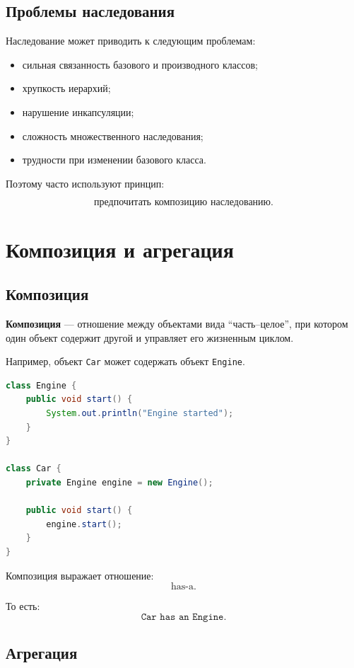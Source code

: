 \documentclass[12pt,a4paper]{article}
\begin{document}
\subsection{Проблемы наследования}

Наследование может приводить к следующим проблемам:
\begin{itemize}
    \item сильная связанность базового и производного классов;
    \item хрупкость иерархий;
    \item нарушение инкапсуляции;
    \item сложность множественного наследования;
    \item трудности при изменении базового класса.
\end{itemize}

Поэтому часто используют принцип:

\[
\text{предпочитать композицию наследованию.}
\]

\section{Композиция и агрегация}

\subsection{Композиция}

\textbf{Композиция} --- отношение между объектами вида ``часть--целое'', при котором один объект содержит другой и управляет его жизненным циклом.

Например, объект \texttt{Car} может содержать объект \texttt{Engine}.

\begin{lstlisting}[language=Java,caption={Композиция}]
class Engine {
    public void start() {
        System.out.println("Engine started");
    }
}

class Car {
    private Engine engine = new Engine();

    public void start() {
        engine.start();
    }
}
\end{lstlisting}

Композиция выражает отношение:
\[
\text{has-a}.
\]

То есть:
\[
\texttt{Car has an Engine}.
\]

\subsection{Агрегация}
\end{document}
